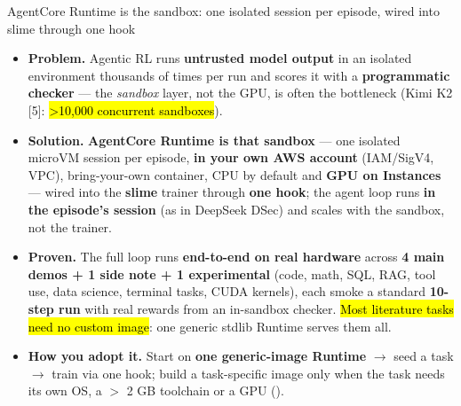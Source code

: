 \begin{frame}{AgentCore Runtime is the sandbox: one isolated session per episode, wired into slime through one hook}
\begin{itemize}\footnotesize\setlength{\itemsep}{1.4mm}
\item \textbf{Problem.} Agentic RL runs \textbf{untrusted model output} in an isolated environment thousands of times per run and scores it with a \textbf{programmatic checker} --- the \emph{sandbox} layer, not the GPU, is often the bottleneck (Kimi K2 [5]: \hl{>10,000 concurrent sandboxes}).
\item \textbf{Solution.} \textbf{AgentCore Runtime is that sandbox} --- one isolated microVM session per episode, \textbf{in your own AWS account} (IAM/SigV4, VPC), bring-your-own container, CPU by default and \textbf{GPU on Instances} --- wired into the \textbf{slime} trainer through \textbf{one hook}; the agent loop runs \textbf{in the episode's session} (as in DeepSeek DSec) and scales with the sandbox, not the trainer.
\item \textbf{Proven.} The full loop runs \textbf{end-to-end on real hardware} across \textbf{4 main demos + 1 side note + 1 experimental} (code, math, SQL, RAG, tool use, data science, terminal tasks, CUDA kernels), each smoke a standard \textbf{10-step run} with real rewards from an in-sandbox checker. \hl{Most literature tasks need no custom image}: one generic stdlib Runtime serves them all.
\item \textbf{How you adopt it.} Start on \textbf{one generic-image Runtime} $\rightarrow$ seed a task $\rightarrow$ train via one  hook; build a task-specific image only when the task needs its own OS, a $>$ 2 GB toolchain or a GPU ().
\end{itemize}
\end{frame}


